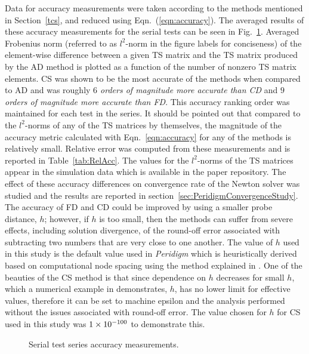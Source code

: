 \documentclass[preprint,12pt]{elsarticle}
\begin{document}
Data for accuracy measurements were taken according to the methods mentioned in
Section~\ref{tcs}, and reduced using Eqn.~(\ref{eqn:accuracy}). The
averaged results of these accuracy measurements for the serial tests can be
seen in Fig.~\ref{fig:serial_accuracy}. Averaged Frobenius norm (referred to as
$l^2$-norm in the figure labels for conciseness) of the element-wise difference
between a given TS matrix and the TS matrix produced by the AD method is
plotted as a function of the number of nonzero TS matrix elements. CS was shown
to be the most accurate of the methods when compared to AD and was roughly
\emph{$6$ orders of magnitude more accurate than CD} and \emph{$9$ orders of
magnitude more accurate than FD}. This accuracy ranking order was maintained
for each test in the series. It should be pointed out that compared to the
$l^2$-norms of any of the TS matrices by themselves, the magnitude of the
accuracy metric calculated with Eqn.~\ref{eqn:accuracy} for any of the methods
is relatively small. Relative error was computed from these measurements and is reported in
Table~\ref{tab:RelAcc}. The values for the $l^2$-norms of the TS matrices appear
in the simulation data which is available in the paper repository. The effect
of these accuracy differences on convergence rate of the Newton solver was studied and the
results are reported in section~\ref{sec:PeridigmConvergenceStudy}.  
%
The accuracy of FD and CD could be improved by using a smaller probe distance,
$h$; however, if $h$ is too small, then the methods can suffer from severe
effects, including solution divergence, of the round-off error associated with
subtracting two numbers that are very close to one another.  The value of $h$
used in this study is the default value used in \emph{Peridigm} which is
heuristically derived based on computational node spacing using the method explained in \cite[pp. 90]{ref-Adaggio}.  
 One of the beauties
of the CS method is that since dependence on $h$ decreases for small $h$, which
a numerical example in \cite[Table 1]{squire1998using} demonstrates, $h$,
has no lower limit for effective values, therefore it can be set to machine epsilon and the
analysis performed without the issues associated with round-off error. The
value chosen for $h$ for CS used in this study was $\num{1.E-100}$ to
demonstrate this.
%
\begin{figure}[tbp] \centering
\scalebox{1.0}{} \caption{Serial test series
accuracy measurements.} \label{fig:serial_accuracy} \end{figure}
\end{document}
